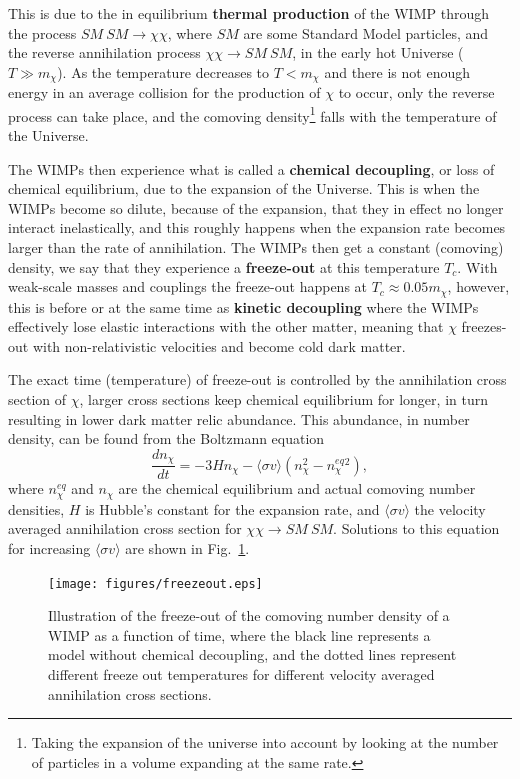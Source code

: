 \documentclass[notes.tex]{subfiles}
\begin{document}
This is due to the in equilibrium {\bf thermal production} of the WIMP through the process $SM\ SM \to \chi \chi$, where $SM$ are some Standard Model particles, and the reverse annihilation process $\chi \chi \to SM\ SM$, in the early hot Universe ($T\gg m_\chi$). As the temperature decreases to $T< m_\chi$ and there is not enough energy in an average collision for the production of $\chi$ to occur, only the reverse process can take place, and the comoving density\footnote{Taking the expansion of the universe into account by looking at the number of particles in a volume expanding at the same rate.} falls with the temperature of the Universe. 

The WIMPs then experience what is called a {\bf chemical decoupling}, or loss of chemical equilibrium, due to the expansion of the Universe. This is when the WIMPs become so dilute, because of the expansion, that they in effect no longer interact inelastically, and this roughly happens when the expansion rate becomes larger than the rate of annihilation. The WIMPs then get a constant (comoving) density, we say that they experience a {\bf freeze-out} at this temperature $T_c$. With weak-scale masses and couplings the freeze-out happens at $T_c \approx 0.05 m_{\chi}$, however, this is before or at the same time as {\bf kinetic decoupling} where the WIMPs effectively lose elastic interactions with the other matter, meaning that $\chi$ freezes-out with non-relativistic velocities and become cold dark matter.

The exact time (temperature) of freeze-out is controlled by the annihilation cross section of $\chi$, larger cross sections keep chemical equilibrium for longer, in turn resulting in lower dark matter relic abundance. This abundance, in number density, can be found from the Boltzmann equation
\begin{equation}
\frac{dn_\chi}{dt} = -3H n_\chi - \langle \sigma v \rangle (n_{\chi}^2 - n_{\chi}^{eq}{}^2),
\end{equation}
where $n_{\chi}^{eq}$ and $n_{\chi}$ are the chemical equilibrium and actual comoving number densities, $H$ is Hubble's constant for the expansion rate, and $\langle \sigma v\rangle$ the velocity averaged annihilation cross section for $\chi\chi \to SM\ SM$. Solutions to this equation for increasing  $\langle \sigma v\rangle$ are shown in Fig.~\ref{fig:freeze_out}.

\begin{figure}[h!]
\begin{center}
\texttt{[image: figures/freezeout.eps]} 
\caption{Illustration of the freeze-out of the comoving number density of a WIMP as a function of time, where the black line represents a model without chemical decoupling, and the dotted lines represent different freeze out temperatures for different velocity averaged annihilation cross sections.}
\label{fig:freeze_out}
\end{center}
\end{figure}
\end{document}
